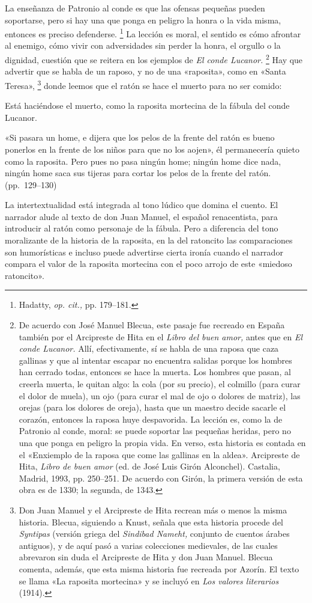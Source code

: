 \documentclass[14pt,twoside,final]{extbook} %
\let\oldfootnote\footnote
\renewcommand\footnote[1]{%
\oldfootnote{\hspace{1mm}#1}}
\begin{document}
La enseñanza de Patronio al conde es que las ofensas pequeñas pueden soportarse, pero si hay una que ponga en peligro la honra o la vida misma, entonces es preciso defenderse.\footnote{Hadatty, \emph{op. cit.,} pp. 179--181. } La lección es moral, el sentido es cómo afrontar al enemigo, cómo vivir con adversidades sin perder la honra, el orgullo o la dignidad, cuestión que se reitera en los ejemplos de \emph{El conde Lucanor.}\footnote{De acuerdo con José Manuel Blecua, este pasaje fue recreado en España también por el Arcipreste de Hita en el \emph{Libro del buen amor,} antes que en \emph{El conde Lucanor.} Allí, efectivamente, sí se habla de una raposa que caza gallinas y que al intentar escapar no encuentra salidas porque los hombres han cerrado todas, entonces se hace la muerta. Los hombres que pasan, al creerla muerta, le quitan algo: la cola (por su precio), el colmillo (para curar el dolor de muela), un ojo (para curar el mal de ojo o dolores de matriz), las orejas (para los dolores de oreja), hasta que un maestro decide sacarle el corazón, entonces la raposa huye despavorida. La lección es, como la de Patronio al conde, moral: se puede soportar las pequeñas heridas, pero no una que ponga en peligro la propia vida. En verso, esta historia es contada en el «Enxiemplo de la raposa que come las gallinas en la aldea». Arcipreste de Hita, \emph{Libro de buen amor} (ed. de José Luis Girón Alconchel). Castalia, Madrid, 1993, pp. 250--251. De acuerdo con Girón, la primera versión de esta obra es de 1330; la segunda, de 1343.} Hay que advertir que se habla de un raposo, y no de una «raposita», como en «Santa Teresa»,\footnote{Don Juan Manuel y el Arcipreste de Hita recrean más o menos la misma historia. Blecua, siguiendo a Knust, señala que esta historia procede del \emph{Syntipas} (versión griega del \emph{Sindibad Nameht,} conjunto de cuentos árabes antiguos), y de aquí pasó a varias colecciones medievales, de las cuales abrevaron sin duda el Arcipreste de Hita y don Juan Manuel. Blecua comenta, además, que esta misma historia fue recreada por Azorín. El texto se llama «La raposita mortecina» y se incluyó en \emph{Los valores literarios} (1914).} donde leemos que el ratón se hace el muerto para no ser comido:
\begin{quoting}
Está haciéndose el muerto, como la raposita mortecina de la fábula del conde Lucanor.

«Si pasara un home, e dijera que los pelos de la frente del ratón es bueno ponerlos en la frente de los niños para que no los aojen», él permanecería quieto como la raposita. Pero pues no pasa ningún home; ningún home dice nada, ningún home saca sus tijeras para cortar los pelos de la frente del ratón. (pp.~129--130)
\end{quoting}
La intertextualidad está integrada al tono lúdico que domina el cuento. El narrador alude al texto de don Juan Manuel, el español renacentista, para introducir al ratón como personaje de la fábula. Pero a diferencia del tono moralizante de la historia de la raposita, en la del ratoncito las comparaciones son humorísticas e incluso puede advertirse cierta ironía cuando el narrador compara el valor de la raposita mortecina con el poco arrojo de este «miedoso ratoncito».
\end{document}
